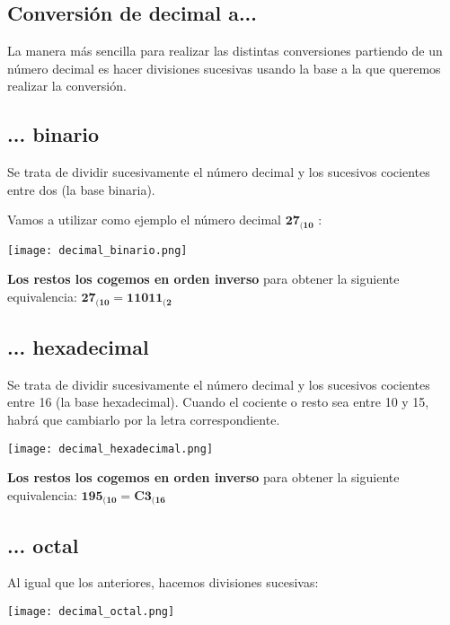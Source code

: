 \subsection{Conversión de decimal a...}
La manera más sencilla para realizar las distintas conversiones partiendo de un número decimal es hacer divisiones sucesivas usando la base a la que queremos realizar la conversión.

\subsection*{... binario}
Se trata de dividir sucesivamente el número decimal y los sucesivos cocientes entre dos (la base binaria).

Vamos a utilizar como ejemplo el número decimal $\mathbf{27_{(10}}$ :

\begin{center}
    \vspace{-20pt}
    \texttt{[image: decimal\_binario.png]}
    \vspace{-20pt}
\end{center}

\textbf{Los restos los cogemos en orden inverso} para obtener la siguiente equivalencia: $\mathbf{27_{(10} = 11011_{(2}}$

\subsection*{... hexadecimal}
Se trata de dividir sucesivamente el número decimal y los sucesivos cocientes entre 16 (la base hexadecimal). Cuando el cociente o resto sea entre 10 y 15, habrá que cambiarlo por la letra correspondiente.

\begin{center}
    \vspace{-10pt}
    \texttt{[image: decimal\_hexadecimal.png]}
    \vspace{-15pt}
\end{center}

\textbf{Los restos los cogemos en orden inverso} para obtener la siguiente equivalencia: $\mathbf{195_{(10} = C3_{(16}}$

\subsection*{... octal}
Al igual que los anteriores, hacemos divisiones sucesivas:

\begin{center}
    \vspace{-10pt}
    \texttt{[image: decimal\_octal.png]}
    \vspace{-15pt}
\end{center}

